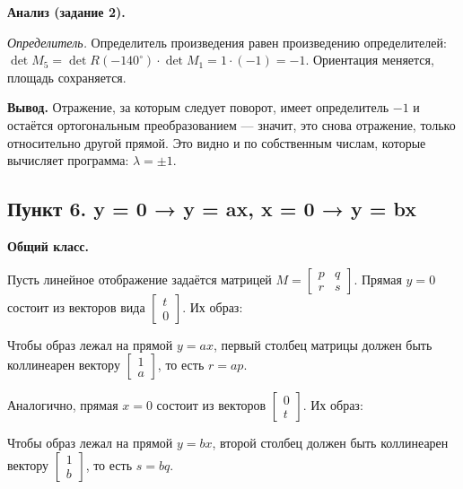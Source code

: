 \documentclass[a4paper,14pt]{extarticle}
\begin{document}
\textbf{Анализ (задание 2).}

\emph{Определитель.} Определитель произведения равен произведению
определителей:
\(\det M_5 = \det R(-140^\circ) \cdot \det M_1 = 1 \cdot (-1) = -1\).
Ориентация меняется, площадь сохраняется.

\textbf{Вывод.} Отражение, за которым следует поворот, имеет
определитель \(-1\) и остаётся ортогональным преобразованием --- значит,
это снова отражение, только относительно другой прямой. Это видно и по
собственным числам, которые вычисляет программа: \(\lambda = \pm 1\).

\hypertarget{ux43fux443ux43dux43aux442-6.-y-0-y-ax-x-0-y-bx}{%
\subsection{Пункт 6. y = 0 → y = ax, x = 0 → y =
bx}\label{ux43fux443ux43dux43aux442-6.-y-0-y-ax-x-0-y-bx}}

\textbf{Общий класс.}

Пусть линейное отображение задаётся матрицей
\(M = \begin{bmatrix} p & q \\ r & s \end{bmatrix}\). Прямая \(y = 0\)
состоит из векторов вида \(\begin{bmatrix} t \\ 0 \end{bmatrix}\). Их
образ:
\begin{center}\end{center}
Чтобы образ лежал на прямой \(y = ax\), первый столбец матрицы должен
быть коллинеарен вектору \(\begin{bmatrix} 1 \\ a \end{bmatrix}\), то
есть \(r = ap\).

Аналогично, прямая \(x = 0\) состоит из векторов
\(\begin{bmatrix} 0 \\ t \end{bmatrix}\). Их образ:
\begin{center}\end{center}
Чтобы образ лежал на прямой \(y = bx\), второй столбец должен быть
коллинеарен вектору \(\begin{bmatrix} 1 \\ b \end{bmatrix}\), то есть
\(s = bq\).
\end{document}
